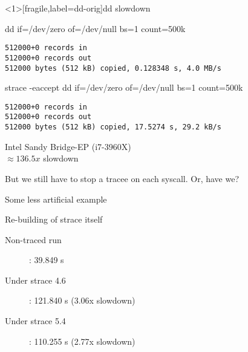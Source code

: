 \documentclass[unicode]{beamer}
\begin{document}
\begin{frame}<1>[fragile,label=dd-orig]{dd slowdown}
\begin{block}{\large dd if=/dev/zero of=/dev/null bs=1 count=500k}
\begin{verbatim}
512000+0 records in
512000+0 records out
512000 bytes (512 kB) copied, 0.128348 s, 4.0 MB/s
\end{verbatim}
\end{block}

\begin{block}{\large strace -eaccept dd if=/dev/zero of=/dev/null bs=1 count=500k}
\begin{verbatim}
512000+0 records in
512000+0 records out
512000 bytes (512 kB) copied, 17.5274 s, 29.2 kB/s
\end{verbatim}
\end{block}
\begin{scriptsize}
Intel Sandy Bridge-EP (i7-3960X) \\
$\approx 136.5x$ slowdown \\
\end{scriptsize}
\pause
But we still have to stop a tracee on each syscall. Or, have we?
\end{frame}

\begin{frame}[fragile]{Some less artificial example}
\begin{block}{\large Re-building of strace itself\footnotemark[1]}
\begin{description}
  \item[Non-traced run]: 39.849 s
  \item[Under strace 4.6]: 121.840 s (3.06x slowdown)
  \item[Under strace 5.4]: 110.255 s (2.77x slowdown)
\end{description}
\end{block}
\end{frame}

\end{document}
